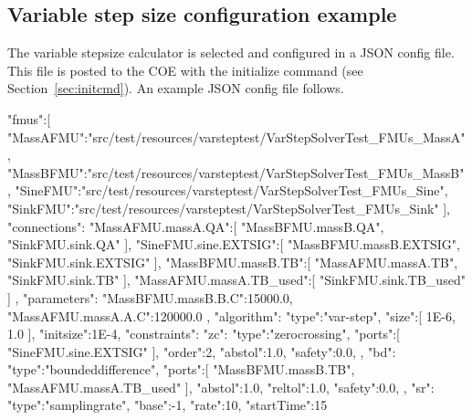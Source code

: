 %
%
%
%
%




\subsection{Variable step size configuration example}\label{sec:var-step-config-example}

The variable stepsize calculator is selected and configured in a JSON config file. This file is posted to the COE with the initialize command (see Section~\ref{sec:initcmd}). An example JSON config file follows.

\begin{json}
{
    "fmus":[
        "{MassAFMU}":"src/test/resources/varsteptest/VarStepSolverTest_FMUs_MassA",
        "{MassBFMU}":"src/test/resources/varsteptest/VarStepSolverTest_FMUs_MassB",
        "{SineFMU}":"src/test/resources/varsteptest/VarStepSolverTest_FMUs_Sine",
        "{SinkFMU}":"src/test/resources/varsteptest/VarStepSolverTest_FMUs_Sink"
    ],
    "connections":{
        "{MassAFMU}.massA.QA":[
            "{MassBFMU}.massB.QA",
            "{SinkFMU}.sink.QA"
        ],
        "{SineFMU}.sine.EXTSIG":[
            "{MassBFMU}.massB.EXTSIG",
            "{SinkFMU}.sink.EXTSIG"
        ],
        "{MassBFMU}.massB.TB":[
            "{MassAFMU}.massA.TB",
            "{SinkFMU}.sink.TB"
        ],
        "{MassAFMU}.massA.TB_used":[
            "{SinkFMU}.sink.TB_used"
        ]
    },
    "parameters":{
        "{MassBFMU}.massB.B.C":15000.0,
        "{MassAFMU}.massA.A.C":120000.0
    },
    "algorithm":{
        "type":"var-step",
        "size":[
            1E-6,
            1.0
        ],
        "initsize":1E-4,
        "constraints":{
            "zc":{
                "type":"zerocrossing",
                "ports":[
                    "{SineFMU}.sine.EXTSIG"
                ],
                "order":2,
                "abstol":1.0,
                "safety":0.0,
            },
            "bd":{
                "type":"boundeddifference",
                "ports":[
                    "{MassBFMU}.massB.TB",
                    "{MassAFMU}.massA.TB_used"
                ],
                "abstol":1.0,
                "reltol":1.0,
                "safety":0.0,
            },
            "sr":{
                "type":"samplingrate",
                "base":-1,
                "rate":10,
                "startTime":15
            }        
        }   
    }
} 
\end{json}




